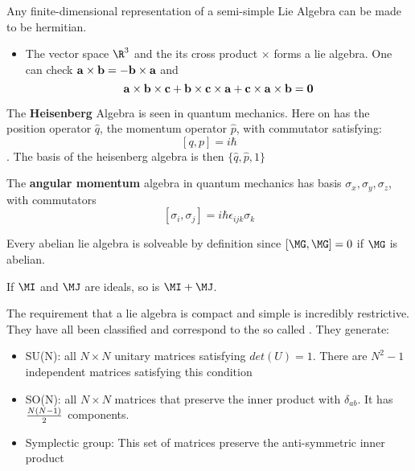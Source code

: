 \documentclass[11pt]{scrartcl}
\begin{document}
\begin{theorem}
	Any finite-dimensional representation of a semi-simple Lie Algebra can be made to be hermitian.
	\end{theorem}

\begin{example}
	\begin{itemize}
		\item The vector space $\R^3$ and the its cross product $\times$ forms a lie algebra.
		One can check $ \bf{a} \times \bf{b} = - \bf{b} \times \bf{a}$ and
		\[ \bf{a} \times \bf{b} \times \bf{c} + \bf{b} \times \bf{c} \times \bf{a} + \bf{c} \times \bf{a} \times \bf{b} = 0\]
		
	\end{itemize}
\end{example}

\begin{example}
	The \textbf{Heisenberg} Algebra is seen in quantum mechanics. Here on has the position operator $\hat{q}$, the momentum operator $\hat{p}$, with commutator satisfying:
	\[ [q, p] = i \hbar \].
	The basis of the heisenberg algebra is then $\{\hat{q}, \hat{p}, 1 \}$
\end{example}

\begin{example}
	The \textbf{angular momentum} algebra in quantum mechanics has basis $\sigma_x, \sigma_y, \sigma_z$, with commutators 
	\[ [\sigma_i, \sigma_j]  = i \hbar \epsilon_{ijk} \sigma_k \]
\end{example}

\begin{example}
	Every abelian lie algebra is solveable by definition since 
	$[\MG, \MG] = 0$ if $\MG$ is abelian.
\end{example}

\begin{example}
	If $\MI$ and $\MJ$ are ideals, so is $\MI + \MJ$.
\end{example}
\begin{example}
	The requirement that a lie algebra is compact and simple is incredibly restrictive.  They have all been classified and correspond to the so called .
	They generate:
	\begin{itemize}
		\item SU(N): all $N \times N$ unitary matrices satisfying $det(U) = 1$.  There are $N^2 - 1$ independent matrices satisfying this condition
		\item SO(N): all $N \times N$ matrices that preserve the inner product with $\delta_{ab}$.  It has ${N(N-1) \over 2}$ components.
		\item Symplectic group: This set of matrices preserve the anti-symmetric inner product
	\end{itemize}
\end{example}
\end{document}

